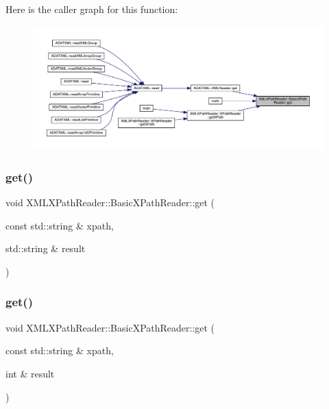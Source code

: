 Here is the caller graph for this function\+:
\nopagebreak
\begin{figure}[H]
\begin{center}
\leavevmode
\includegraphics[width=350pt]{d6/dbf/classXMLXPathReader_1_1BasicXPathReader_a167f3e878414daf1c5804ee1de3235e9_icgraph}
\end{center}
\end{figure}
\mbox{\label{classXMLXPathReader_1_1BasicXPathReader_a3498d5a0bf7d47094e2d8f7d81e629af}} 
\subsubsection{\texorpdfstring{get()}{get()}\hspace{0.1cm}{\footnotesize\ttfamily [2/20]}}
{\footnotesize\ttfamily void X\+M\+L\+X\+Path\+Reader\+::\+Basic\+X\+Path\+Reader\+::get (\begin{DoxyParamCaption}\item[{const std\+::string \&}]{xpath,  }\item[{std\+::string \&}]{result }\end{DoxyParamCaption})}

\mbox{\label{classXMLXPathReader_1_1BasicXPathReader_adffe50d2d1617b1a1769e6df0e64b33f}} 
\subsubsection{\texorpdfstring{get()}{get()}\hspace{0.1cm}{\footnotesize\ttfamily [3/20]}}
{\footnotesize\ttfamily void X\+M\+L\+X\+Path\+Reader\+::\+Basic\+X\+Path\+Reader\+::get (\begin{DoxyParamCaption}\item[{const std\+::string \&}]{xpath,  }\item[{int \&}]{result }\end{DoxyParamCaption})}

